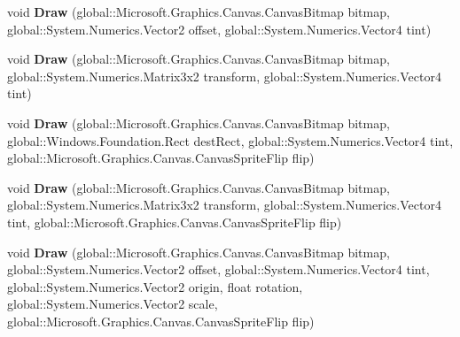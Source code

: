 \begin{DoxyCompactItemize}
void {\bfseries Draw} (global\+::\+Microsoft.\+Graphics.\+Canvas.\+Canvas\+Bitmap bitmap, global\+::\+System.\+Numerics.\+Vector2 offset, global\+::\+System.\+Numerics.\+Vector4 tint)
\item 
\mbox{\label{interface_microsoft_1_1_graphics_1_1_canvas_1_1_i_canvas_sprite_batch_a43b4642b34dc5a505f5641f8ff427b90}} 
void {\bfseries Draw} (global\+::\+Microsoft.\+Graphics.\+Canvas.\+Canvas\+Bitmap bitmap, global\+::\+System.\+Numerics.\+Matrix3x2 transform, global\+::\+System.\+Numerics.\+Vector4 tint)
\item 
\mbox{\label{interface_microsoft_1_1_graphics_1_1_canvas_1_1_i_canvas_sprite_batch_ab1352e40c4e4dc5470141c64e30a1bbf}} 
void {\bfseries Draw} (global\+::\+Microsoft.\+Graphics.\+Canvas.\+Canvas\+Bitmap bitmap, global\+::\+Windows.\+Foundation.\+Rect dest\+Rect, global\+::\+System.\+Numerics.\+Vector4 tint, global\+::\+Microsoft.\+Graphics.\+Canvas.\+Canvas\+Sprite\+Flip flip)
\item 
\mbox{\label{interface_microsoft_1_1_graphics_1_1_canvas_1_1_i_canvas_sprite_batch_a3dbc3671a300529cccb128a7e731641a}} 
void {\bfseries Draw} (global\+::\+Microsoft.\+Graphics.\+Canvas.\+Canvas\+Bitmap bitmap, global\+::\+System.\+Numerics.\+Matrix3x2 transform, global\+::\+System.\+Numerics.\+Vector4 tint, global\+::\+Microsoft.\+Graphics.\+Canvas.\+Canvas\+Sprite\+Flip flip)
\item 
\mbox{\label{interface_microsoft_1_1_graphics_1_1_canvas_1_1_i_canvas_sprite_batch_a6c8abe6402266b85e01ea6236060016d}} 
void {\bfseries Draw} (global\+::\+Microsoft.\+Graphics.\+Canvas.\+Canvas\+Bitmap bitmap, global\+::\+System.\+Numerics.\+Vector2 offset, global\+::\+System.\+Numerics.\+Vector4 tint, global\+::\+System.\+Numerics.\+Vector2 origin, float rotation, global\+::\+System.\+Numerics.\+Vector2 scale, global\+::\+Microsoft.\+Graphics.\+Canvas.\+Canvas\+Sprite\+Flip flip)
\item 
\mbox{\label{interface_microsoft_1_1_graphics_1_1_canvas_1_1_i_canvas_sprite_batch_aa1520881b529a87baf47530abaa95312}} 

\end{DoxyCompactItemize}
